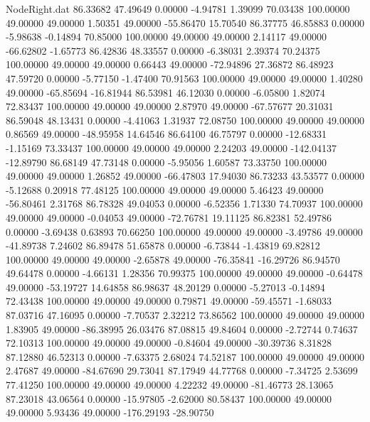 \begin{filecontents}{NodeRight.dat}
  86.33682   47.49649    0.00000    -4.94781    1.39099   70.03438  100.00000   49.00000   49.00000    1.50351   49.00000  -55.86470   15.70540
  86.37775   46.85883    0.00000    -5.98638   -0.14894   70.85000  100.00000   49.00000   49.00000    2.14117   49.00000  -66.62802   -1.65773
  86.42836   48.33557    0.00000    -6.38031    2.39374   70.24375  100.00000   49.00000   49.00000    0.66443   49.00000  -72.94896   27.36872
  86.48923   47.59720    0.00000    -5.77150   -1.47400   70.91563  100.00000   49.00000   49.00000    1.40280   49.00000  -65.85694  -16.81944
  86.53981   46.12030    0.00000    -6.05800    1.82074   72.83437  100.00000   49.00000   49.00000    2.87970   49.00000  -67.57677   20.31031
  86.59048   48.13431    0.00000    -4.41063    1.31937   72.08750  100.00000   49.00000   49.00000    0.86569   49.00000  -48.95958   14.64546
  86.64100   46.75797    0.00000   -12.68331   -1.15169   73.33437  100.00000   49.00000   49.00000    2.24203   49.00000 -142.04137  -12.89790
  86.68149   47.73148    0.00000    -5.95056    1.60587   73.33750  100.00000   49.00000   49.00000    1.26852   49.00000  -66.47803   17.94030
  86.73233   43.53577    0.00000    -5.12688    0.20918   77.48125  100.00000   49.00000   49.00000    5.46423   49.00000  -56.80461    2.31768
  86.78328   49.04053    0.00000    -6.52356    1.71330   74.70937  100.00000   49.00000   49.00000   -0.04053   49.00000  -72.76781   19.11125
  86.82381   52.49786    0.00000    -3.69438    0.63893   70.66250  100.00000   49.00000   49.00000   -3.49786   49.00000  -41.89738    7.24602
  86.89478   51.65878    0.00000    -6.73844   -1.43819   69.82812  100.00000   49.00000   49.00000   -2.65878   49.00000  -76.35841  -16.29726
  86.94570   49.64478    0.00000    -4.66131    1.28356   70.99375  100.00000   49.00000   49.00000   -0.64478   49.00000  -53.19727   14.64858
  86.98637   48.20129    0.00000    -5.27013   -0.14894   72.43438  100.00000   49.00000   49.00000    0.79871   49.00000  -59.45571   -1.68033
  87.03716   47.16095    0.00000    -7.70537    2.32212   73.86562  100.00000   49.00000   49.00000    1.83905   49.00000  -86.38995   26.03476
  87.08815   49.84604    0.00000    -2.72744    0.74637   72.10313  100.00000   49.00000   49.00000   -0.84604   49.00000  -30.39736    8.31828
  87.12880   46.52313    0.00000    -7.63375    2.68024   74.52187  100.00000   49.00000   49.00000    2.47687   49.00000  -84.67690   29.73041
  87.17949   44.77768    0.00000    -7.34725    2.53699   77.41250  100.00000   49.00000   49.00000    4.22232   49.00000  -81.46773   28.13065
  87.23018   43.06564    0.00000   -15.97805   -2.62000   80.58437  100.00000   49.00000   49.00000    5.93436   49.00000 -176.29193  -28.90750

\end{filecontents}
